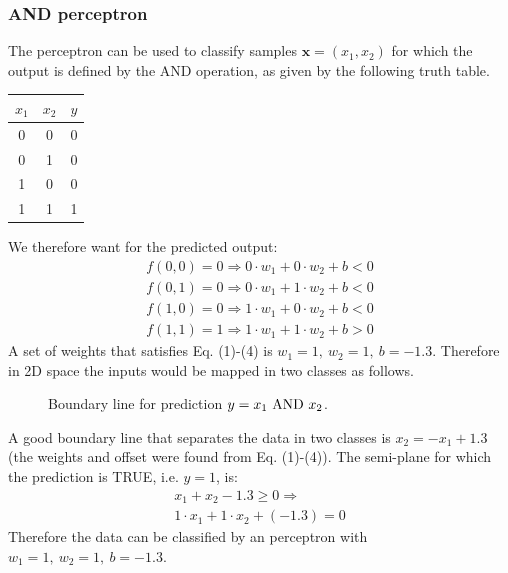 \documentclass[a4paper]{article}
\begin{document}
\subsubsection{AND perceptron}
The perceptron can be used to classify samples $\textbf{x}=(x_1,x_2)$ for which the output is defined by the AND operation, as given by the following truth table.
\begin{center}
\begin{tabular}{c|c|c}
$x_1$ & $x_2$ & $y$ \\
\hline
0 & 0 & 0 \\
0 & 1 & 0 \\
1 & 0 & 0 \\
1 & 1 & 1 
\end{tabular}
\end{center}
We therefore want for the predicted output:
\begin{gather*}
f(0,0) = 0 \Rightarrow 0\cdot w_1 + 0\cdot w_2 + b < 0 \tag{1}\\
f(0,1) = 0 \Rightarrow 0\cdot w_1 + 1\cdot w_2 + b < 0 \tag{2}\\
f(1,0) = 0 \Rightarrow 1\cdot w_1 + 0\cdot w_2 + b < 0 \tag{3}\\
f(1,1) = 1 \Rightarrow 1\cdot w_1 + 1\cdot w_2 + b > 0 \tag{4}
\end{gather*}
A set of weights that satisfies Eq. (1)-(4) is $w_1=1,\ w_2=1,\ b=-1.3$. Therefore in 2D space the inputs would be mapped in two classes as follows. 
\begin{figure}[H]
    \centering
    
    \caption{Boundary line for prediction $y=x_1 \ \textup{AND} \ x_2$.}
\end{figure}
A good boundary line that separates the data in two classes is $x_2 = -x_1 + 1.3$ (the weights and offset were found from Eq. (1)-(4)).
The semi-plane for which the prediction is TRUE, i.e. $y=1$, is:
\begin{gather*}
   x_1 + x_2 - 1.3 \geq 0 \Rightarrow\\
   1\cdot x_1 + 1\cdot x_2 + (-1.3) = 0
\end{gather*}
Therefore the data can be classified by an perceptron with $w_1=1, \ w_2 = 1, \ b = -1.3$.
\end{document}
